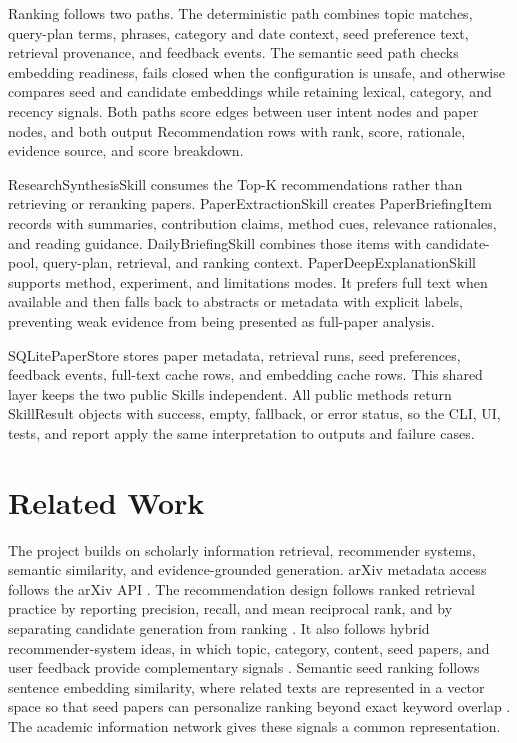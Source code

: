 \documentclass{article}
\begin{document}
Ranking follows two paths. The deterministic path combines topic matches, query-plan terms, phrases, category and date context, seed preference text, retrieval provenance, and feedback events. The semantic seed path checks embedding readiness, fails closed when the configuration is unsafe, and otherwise compares seed and candidate embeddings while retaining lexical, category, and recency signals. Both paths score edges between user intent nodes and paper nodes, and both output Recommendation rows with rank, score, rationale, evidence source, and score breakdown.

ResearchSynthesisSkill consumes the Top-K recommendations rather than retrieving or reranking papers. PaperExtractionSkill creates PaperBriefingItem records with summaries, contribution claims, method cues, relevance rationales, and reading guidance. DailyBriefingSkill combines those items with candidate-pool, query-plan, retrieval, and ranking context. PaperDeepExplanationSkill supports method, experiment, and limitations modes. It prefers full text when available and then falls back to abstracts or metadata with explicit labels, preventing weak evidence from being presented as full-paper analysis.

SQLitePaperStore stores paper metadata, retrieval runs, seed preferences, feedback events, full-text cache rows, and embedding cache rows. This shared layer keeps the two public Skills independent. All public methods return SkillResult objects with success, empty, fallback, or error status, so the CLI, UI, tests, and report apply the same interpretation to outputs and failure cases.

\section{Related Work}

The project builds on scholarly information retrieval, recommender systems, semantic similarity, and evidence-grounded generation. arXiv metadata access follows the arXiv API \citep{arxivapi}. The recommendation design follows ranked retrieval practice by reporting precision, recall, and mean reciprocal rank, and by separating candidate generation from ranking \citep{manning2008}. It also follows hybrid recommender-system ideas, in which topic, category, content, seed papers, and user feedback provide complementary signals \citep{burke2002}. Semantic seed ranking follows sentence embedding similarity, where related texts are represented in a vector space so that seed papers can personalize ranking beyond exact keyword overlap \citep{reimers2019}. The academic information network gives these signals a common representation.
\end{document}

